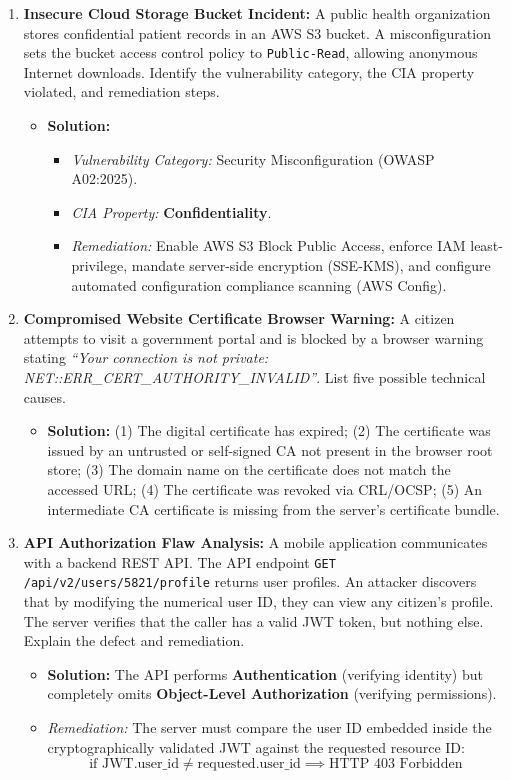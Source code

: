 \begin{enumerate}[label=\textbf{Problem \arabic*.,resume},leftmargin=1.5cm]
\item \textbf{Insecure Cloud Storage Bucket Incident:}
A public health organization stores confidential patient records in an AWS S3 bucket. A misconfiguration sets the bucket access control policy to \texttt{Public-Read}, allowing anonymous Internet downloads. Identify the vulnerability category, the CIA property violated, and remediation steps.
\begin{itemize}
\item \textbf{Solution:}
\begin{itemize}
\item \textit{Vulnerability Category:} Security Misconfiguration (OWASP A02:2025).
\item \textit{CIA Property:} \textbf{Confidentiality}.
\item \textit{Remediation:} Enable AWS S3 Block Public Access, enforce IAM least-privilege, mandate server-side encryption (SSE-KMS), and configure automated configuration compliance scanning (AWS Config).
\end{itemize}
\end{itemize}

\item \textbf{Compromised Website Certificate Browser Warning:}
A citizen attempts to visit a government portal and is blocked by a browser warning stating \textit{``Your connection is not private: NET::ERR\_CERT\_AUTHORITY\_INVALID''}. List five possible technical causes.
\begin{itemize}
\item \textbf{Solution:} (1) The digital certificate has expired; (2) The certificate was issued by an untrusted or self-signed CA not present in the browser root store; (3) The domain name on the certificate does not match the accessed URL; (4) The certificate was revoked via CRL/OCSP; (5) An intermediate CA certificate is missing from the server's certificate bundle.
\end{itemize}

\item \textbf{API Authorization Flaw Analysis:}
A mobile application communicates with a backend REST API. The API endpoint \texttt{GET /api/v2/users/5821/profile} returns user profiles. An attacker discovers that by modifying the numerical user ID, they can view any citizen's profile. The server verifies that the caller has a valid JWT token, but nothing else. Explain the defect and remediation.
\begin{itemize}
\item \textbf{Solution:} The API performs \textbf{Authentication} (verifying identity) but completely omits \textbf{Object-Level Authorization} (verifying permissions).
\item \textit{Remediation:} The server must compare the user ID embedded inside the cryptographically validated JWT against the requested resource ID:
\[ \text{if } \text{JWT.user\_id} \neq \text{requested.user\_id} \implies \text{HTTP 403 Forbidden} \]
\end{itemize}


\end{enumerate}
